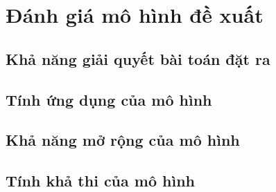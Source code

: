 \chapter{Đánh giá mô hình đề xuất}
\section{Khả năng giải quyết bài toán đặt ra}
\section{Tính ứng dụng của mô hình}
\section{Khả năng mở rộng của mô hình}
\section{Tính khả thi của mô hình}